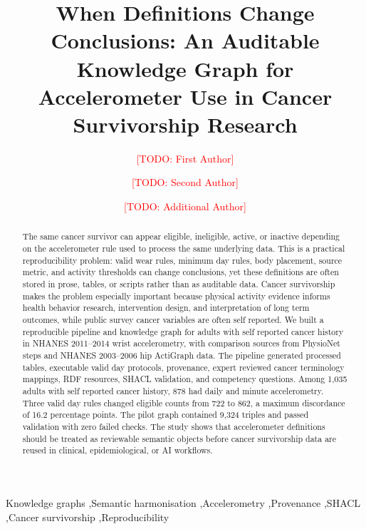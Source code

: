 \documentclass[final,5p,times,twocolumn]{elsarticle}
\newcommand{\todo}[1]{\textcolor{red}{[TODO: #1]}}
\begin{document}
\begin{frontmatter}

\title{When Definitions Change Conclusions: An Auditable Knowledge Graph for Accelerometer Use in Cancer Survivorship Research}

\author[aff1]{\todo{First Author}}
\ead{\todo{corresponding.author@email}}
\author[aff1]{\todo{Second Author}}
\author[aff2]{\todo{Additional Author}}

\address[aff1]{\todo{Department, Institution, City, Country}}
\address[aff2]{\todo{Department, Institution, City, Country}}

\begin{abstract}
The same cancer survivor can appear eligible, ineligible, active, or inactive depending on the accelerometer rule used to process the same underlying data. This is a practical reproducibility problem: valid wear rules, minimum day rules, body placement, source metric, and activity thresholds can change conclusions, yet these definitions are often stored in prose, tables, or scripts rather than as auditable data. Cancer survivorship makes the problem especially important because physical activity evidence informs health behavior research, intervention design, and interpretation of long term outcomes, while public survey cancer variables are often self reported. We built a reproducible pipeline and knowledge graph for adults with self reported cancer history in NHANES 2011--2014 wrist accelerometry, with comparison sources from PhysioNet steps and NHANES 2003--2006 hip ActiGraph data. The pipeline generated processed tables, executable valid day protocols, provenance, expert reviewed cancer terminology mappings, RDF resources, SHACL validation, and competency questions. Among 1,035 adults with self reported cancer history, 878 had daily and minute accelerometry. Three valid day rules changed eligible counts from 722 to 862, a maximum discordance of 16.2 percentage points. The pilot graph contained 9,324 triples and passed validation with zero failed checks. The study shows that accelerometer definitions should be treated as reviewable semantic objects before cancer survivorship data are reused in clinical, epidemiological, or AI workflows.
\end{abstract}

\begin{keyword}
Knowledge graphs \sep Semantic harmonisation \sep Accelerometry \sep Provenance \sep SHACL \sep Cancer survivorship \sep Reproducibility
\end{keyword}

\end{frontmatter}
\end{document}
